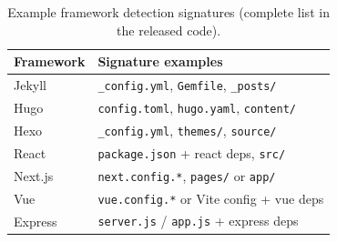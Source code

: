 


\begin{table}[t]
\centering
\small
\begin{tabular}{ll}
\hline
\textbf{Framework} & \textbf{Signature examples} \\
\hline
Jekyll & \texttt{\_config.yml}, \texttt{Gemfile}, \texttt{\_posts/} \\
Hugo & \texttt{config.toml}, \texttt{hugo.yaml}, \texttt{content/} \\
Hexo & \texttt{\_config.yml}, \texttt{themes/}, \texttt{source/} \\
React & \texttt{package.json} + react deps, \texttt{src/} \\
Next.js & \texttt{next.config.*}, \texttt{pages/} or \texttt{app/} \\
Vue & \texttt{vue.config.*} or Vite config + vue deps \\
Express & \texttt{server.js} / \texttt{app.js} + express deps \\
\hline
\end{tabular}
\caption{Example framework detection signatures (complete list in the released code).}
\label{tab:framework_rules}
\end{table}

